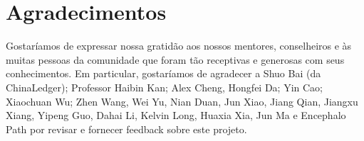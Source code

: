 \documentclass[UTF8,nofonts]{article}
\begin{document}
\begin{multicols}{2}
\begin{itemize}
\end{itemize}


\section{Agradecimentos}

Gostaríamos de expressar nossa gratidão aos nossos mentores, conselheiros e às muitas pessoas da comunidade que foram tão receptivas e generosas com seus conhecimentos. Em particular, gostaríamos de agradecer a Shuo Bai (da ChinaLedger); Professor Haibin Kan; Alex Cheng, Hongfei Da; Yin Cao; Xiaochuan Wu; Zhen Wang, Wei Yu, Nian Duan, Jun Xiao, Jiang Qian, Jiangxu Xiang, Yipeng Guo, Dahai Li, Kelvin Long, Huaxia Xia, Jun Ma e Encephalo Path por revisar e fornecer feedback sobre este projeto. 
 






\end{multicols}
\end{document}
